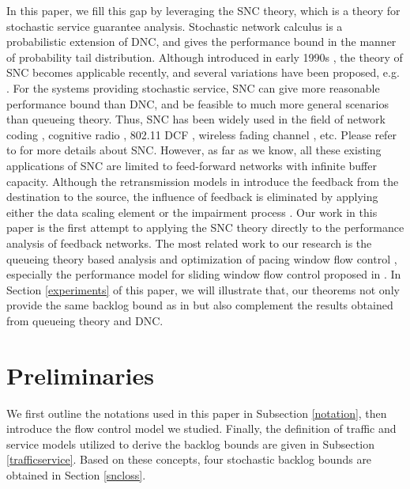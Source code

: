 \documentclass[12pt]{article}
\begin{document}
In this paper, we fill this gap by leveraging the SNC theory, which is a theory for stochastic service guarantee analysis. Stochastic network calculus is a probabilistic extension of DNC, and gives the performance bound in the manner of probability tail distribution. Although introduced in early 1990s \cite{Chan94}, the theory of SNC becomes applicable recently, and several variations have been proposed, e.g. \cite{jiang2006basic,Fidl06,5984844,Ciucu2006Scaling}. For the systems providing stochastic service, SNC can give more reasonable performance bound than DNC, and be feasible to much more general scenarios than queueing theory. Thus, SNC has been widely used in the field of network coding \cite{10.1109/TPDS.2010.192}, cognitive radio \cite{5466711}, 802.11 DCF \cite{xie2010network}\cite{wang2012effectiveness}, wireless fading channel \cite{Fidler2006network,wangperformance}, etc. Please refer to \cite{JiangLiu-15877} for more details about SNC. However, as far as we know, all these existing applications of SNC are limited to feed-forward networks with infinite buffer capacity. Although the retransmission models in \cite{wangperformance,5466711} introduce the feedback from the destination to the source, the influence of feedback is eliminated by applying either the data scaling element \cite{wangperformance} or the impairment process \cite{5466711}. Our work in this paper is the first attempt to applying the SNC theory directly to the performance analysis of feedback networks. The most related work to our research is the queueing theory based analysis and optimization of pacing window flow control \cite{jung1996analysis,1095377}, especially the performance model for sliding window flow control proposed in \cite{jung1996analysis}. In Section \ref{experiments} of this paper, we will illustrate that, our theorems not only provide the same backlog bound as in \cite{jung1996analysis} but also complement the results obtained from queueing theory and DNC.

\section{Preliminaries}\label{Notations}
We first outline the notations used in this paper in Subsection \ref{notation}, then introduce the flow control model we studied. Finally, the definition of traffic and service models utilized to derive the backlog bounds are given in Subsection \ref{trafficservice}. Based on these concepts, four stochastic backlog bounds are obtained in Section \ref{sncloss}.
\end{document}
